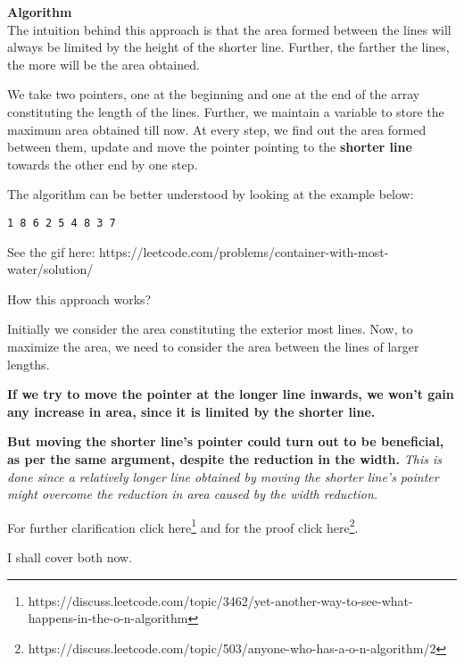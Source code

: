 
\noindent{}\textbf{Algorithm}\\
The intuition behind this approach is that the area formed between the lines
will always be limited by the height of the shorter line. Further, the
farther the lines, the more will be the area obtained.

We take two pointers, one at the beginning and one at the end of the array
constituting the length of the lines. Further, we maintain a variable
 to store the maximum area obtained till now. At every step, we
find out the area formed between them, update  and move the
pointer pointing to the \textbf{shorter line} towards the other end by one
step.

The algorithm can be better understood by looking at the example below:
\begin{lstlisting}[style=raygeneric]
1 8 6 2 5 4 8 3 7
\end{lstlisting}

See the gif here: https://leetcode.com/problems/container-with-most-water/solution/

How this approach works?

Initially we consider the area constituting the exterior most lines. Now, to
maximize the area, we need to consider the area between the lines of larger
lengths. 

\textbf{If we try to move the pointer at the longer line inwards, we won't
gain any increase in area, since it is limited by the shorter line.}

\textbf{But moving the shorter line's pointer could turn out to be
  beneficial, as per the same argument, despite the reduction in the width.}
 \emph{This is done since a relatively longer line
  obtained by moving the shorter line's pointer might overcome the reduction
  in area caused by the width reduction.}

For further clarification click
here\footnote{https://discuss.leetcode.com/topic/3462/yet-another-way-to-see-what-happens-in-the-o-n-algorithm}
and for the proof click here\footnote{https://discuss.leetcode.com/topic/503/anyone-who-has-a-o-n-algorithm/2}.

I shall cover both now.

